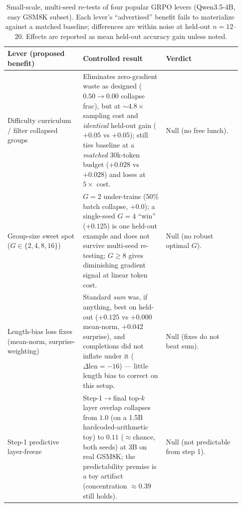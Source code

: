\begin{table}[t]
  \centering
  \small
  \caption{Small-scale, multi-seed re-tests of four popular GRPO levers
  (Qwen3.5-4B, easy GSM8K subset). Each lever's ``advertised'' benefit
  fails to materialize against a matched baseline; differences are
  within noise at held-out $n{=}12$--$20$. Effects are reported as
  mean held-out accuracy gain unless noted.}
  \label{tab:smallscale-nulls}
  \begin{tabular}{@{}p{0.30\linewidth}p{0.33\linewidth}p{0.30\linewidth}@{}}
    \toprule
    \textbf{Lever (proposed benefit)} & \textbf{Controlled result} & \textbf{Verdict} \\
    \midrule
    Difficulty curriculum / filter collapsed groups
      & Eliminates zero-gradient waste as designed ($0.50{\to}0.00$
        collapse frac), but at ${\sim}4.8\times$ sampling cost and
        \emph{identical} held-out gain ($+0.05$ vs $+0.05$); still ties
        baseline at a \emph{matched} $30$k-token budget ($+0.028$ vs
        $+0.028$) and loses at $5\times$ cost.
      & Null (no free lunch). \\
    \addlinespace
    Group-size sweet spot ($G\in\{2,4,8,16\}$)
      & $G{=}2$ under-trains ($50\%$ batch collapse, $+0.0$); a
        single-seed $G{=}4$ ``win'' ($+0.125$) is one held-out example
        and does not survive multi-seed re-testing; $G{\geq}8$ gives
        diminishing gradient signal at linear token cost.
      & Null (no robust optimal $G$). \\
    \addlinespace
    Length-bias loss fixes (mean-norm, surprise-weighting)
      & Standard \emph{sum} was, if anything, best on held-out ($+0.125$
        vs $+0.000$ mean-norm, $+0.042$ surprise), and completions did
        not inflate under it ($\Delta\text{len}{=}-16$) --- little
        length bias to correct on this setup.
      & Null (fixes do not beat sum). \\
    \addlinespace
    Step-1 predictive layer-freeze
      & Step-1$\to$final top-$k$ layer overlap collapses from $1.0$ (on
        a 1.5B hardcoded-arithmetic toy) to $0.11$ ($\approx$chance,
        both seeds) at 3B on real GSM8K; the predictability premise is a
        toy artifact (concentration $\approx0.39$ still holds).
      & Null (not predictable from step 1). \\
    \bottomrule
  \end{tabular}
\end{table}

